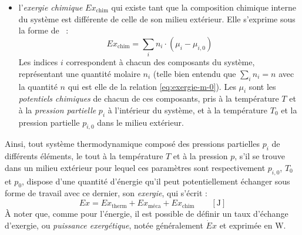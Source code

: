 \documentclass[a4paper,11pt]{scrartcl}
\begin{document}
\begin{itemize}
		différence de pression entre l'intérieur et l'extérieur du
		système, et dont l'expression n'est autre que celle du travail
		de détente isotherme (à température $T_0$) de $p$ à
		$p_0$~\cite{TI-BE8013} : \begin{equation}
			Ex_{\text{méca}} = n \cdot \textsf{R} \cdot T_0 \cdot
			\ln\left( \frac{p}{p_0} \right) \label{eq:exergie-m-0}
		\end{equation} $n$ est ici la quantité molaire de matière mise
		en jeu, et $\mathsf{R}$ est la constante universelle des gaz
		parfaits\footnote{On rappelle au passage que $\mathsf{R} =
		\numprint[J/(mol \cdot K)]{8.3144486}$.};
	\item l'\emph{exergie chimique} $Ex_{\text{chim}}$ qui existe tant que
		la composition chimique interne du système est différente de
		celle de son milieu extérieur. Elle s'exprime sous la forme
		de~\cite{TI-BE8015} : \begin{equation}
			Ex_{\text{chim}} = \sum_i n_i \cdot (\mu_i - \mu_{i,0})
		\end{equation} Les indices $i$ correspondent à chacun des
		composants du système, représentant une quantité molaire $n_i$
		(telle bien entendu que $\sum_i n_i = n$ avec la quantité $n$
		qui est elle de la relation \eqref{eq:exergie-m-0}). Les $\mu_i$
		sont les \emph{potentiels chimiques} de chacun de ces
		composants, pris à la température $T$ et à la \emph{pression
		partielle} $p_i$ à l'intérieur du système, et à la température
		$T_0$ et la pression partielle $p_{i,0}$ dans le milieu
		extérieur.
\end{itemize} Ainsi, tout système thermodynamique composé des pressions
partielles $p_i$ de différents éléments, le tout à la température $T$ et à la
pression $p$, s'il se trouve dans un milieu extérieur pour lequel ces
paramètres sont respectivement $p_{i,0}$, $T_0$ et $p_0$, dispose d'une
quantité d'énergie qu'il peut potentiellement échanger sous forme de travail
avec ce dernier, son \emph{exergie}, qui s'écrit : \begin{equation}
	Ex = Ex_{\text{therm}} + Ex_{\text{méca}} + Ex_{\text{chim}} \qquad
	[\mathrm{J}]
\end{equation} À noter que, comme pour l'énergie, il est possible de définir un
taux d'échange d'exergie, ou \emph{puissance exergétique}, notée généralement
$\dot{E}x$ et exprimée en W.

\end{document}
